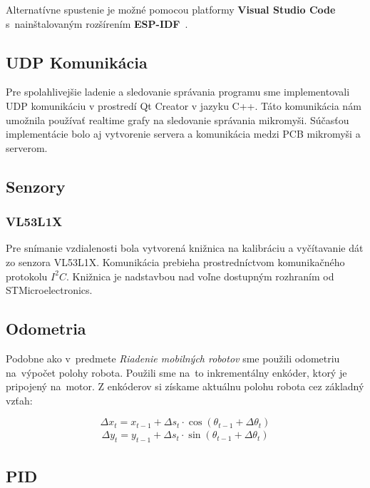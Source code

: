 Alternatívne spustenie je možné pomocou platformy \textbf{Visual Studio Code} s~nainštalovaným rozšírením
\textbf{ESP-IDF}~\cite{espIDF}.
\subsection{UDP Komunikácia}
Pre spolahlivejšie ladenie a sledovanie správania programu sme implementovali UDP komunikáciu v prostredí Qt Creator v jazyku C++. Táto komunikácia nám umožnila používať realtime grafy na sledovanie správania mikromyši. Súčasťou implementácie bolo aj vytvorenie servera a komunikácia medzi PCB mikromyši a serverom.
\subsection{Senzory}

\subsubsection{VL53L1X}
Pre snímanie vzdialenosti bola vytvorená knižnica na kalibráciu a vyčítavanie dát zo senzora VL53L1X. Komunikácia prebieha prostredníctvom komunikačného protokolu $I^2 C$. Knižnica je nadstavbou nad voľne dostupným rozhraním od STMicroelectronics.

\subsection{Odometria}
\label{subsec:odometria}

Podobne ako v~predmete \textit{Riadenie mobilných robotov} sme použili odometriu na~výpočet polohy robota.
Použili sme na~to inkrementálny enkóder, ktorý je pripojený na~motor. Z enkóderov si získame aktuálnu polohu robota
cez základný vzťah:

\begin{equation}
	\label{eq:odometria}
	 \Delta x_t = x_{t-1} + \Delta s_t \cdot \cos(\theta_{t-1} + \Delta \theta_t)
\end{equation}
\begin{align*}
	\Delta y_t = y_{t-1} + \Delta s_t \cdot \sin(\theta_{t-1} + \Delta \theta_t)
\end{align*}

\newpage

\subsection{PID}
\label{subsec:pid}


